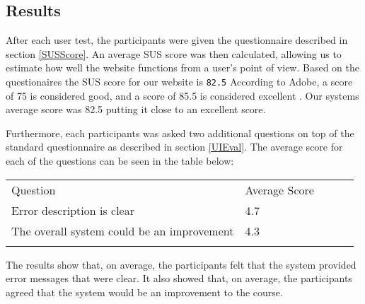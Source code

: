 \subsection*{Results} \label{UiResults}
After each user test, the participants were given the questionnaire described in section \ref{SUSScore}. An average SUS score was then calculated, allowing us to estimate how well the website functions from a user’s point of view. Based on the questionaires the SUS score for our website is \texttt{82.5}
According to Adobe, a score of 75 is considered good, and a score of 85.5 is considered excellent \cite{adobeSUS}. Our systems average score was 82.5 putting it close to an excellent score. 

Furthermore, each participants was asked two additional questions on top of the standard questionnaire as described in section \ref{UIEval}. The average score for each of the questions can be seen in the table below:
\begin{table}[H]
\centering
\begin{tabular}{lllll}
\cline{1-2}
\multicolumn{1}{|l|}{\cellcolor[HTML]{C0C0C0}Question}           & \multicolumn{1}{l|}{\cellcolor[HTML]{C0C0C0}Average Score} &  &  &  \\ \cline{1-2}
\multicolumn{1}{|l|}{Error description is clear}                 & \multicolumn{1}{l|}{4.7}                                    &  &  &  \\ \cline{1-2}
\multicolumn{1}{|l|}{The overall system could be an improvement} & \multicolumn{1}{l|}{4.3}                                    &  &  &  \\ \cline{1-2}
                                                                 &                                                           &  &  & 
\end{tabular}
\end{table}
The results show that, on average, the participants felt that the system provided error messages that were clear. 
It also showed that, on average, the participants agreed that the system would be an improvement to the course.